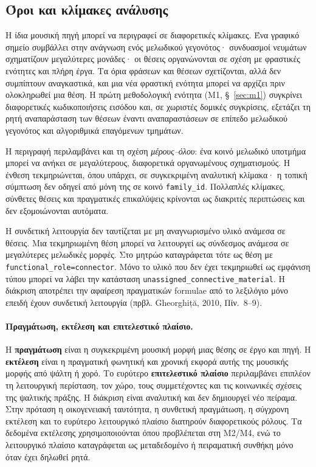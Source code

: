 \documentclass[11pt,a4paper]{article}
\begin{document}
\subsection{Όροι και κλίμακες ανάλυσης}

Η ίδια μουσική πηγή μπορεί να περιγραφεί σε διαφορετικές κλίμακες. Ένα γραφικό σημείο συμβάλλει στην ανάγνωση ενός μελωδικού γεγονότος· συνδυασμοί νευμάτων σχηματίζουν μεγαλύτερες μονάδες· οι θέσεις οργανώνονται σε σχέση με φραστικές ενότητες και πλήρη έργα. Τα όρια φράσεων και θέσεων σχετίζονται, αλλά δεν συμπίπτουν αναγκαστικά, και μια νέα φραστική ενότητα μπορεί να αρχίζει πριν ολοκληρωθεί μια θέση. Η πρώτη μεθοδολογική ενότητα (M1, §~\ref{sec:m1}) συγκρίνει διαφορετικές κωδικοποιήσεις εισόδου και, σε χωριστές δομικές συγκρίσεις, εξετάζει τη ρητή αναπαράσταση των θέσεων έναντι αναπαραστάσεων σε επίπεδο μελωδικού γεγονότος και αλγοριθμικά επαγόμενων τμημάτων.

Η περιγραφή περιλαμβάνει και τη σχέση \emph{μέρους--όλου}: ένα κοινό μελωδικό υποτμήμα μπορεί να ανήκει σε μεγαλύτερους, διαφορετικά οργανωμένους σχηματισμούς. Η ένθεση τεκμηριώνεται, όπου υπάρχει, σε συγκεκριμένη αναλυτική κλίμακα· η τοπική σύμπτωση δεν οδηγεί από μόνη της σε κοινό \texttt{family\_id}. Πολλαπλές κλίμακες, σύνθετες θέσεις και πραγματικές επικαλύψεις κρίνονται ως διακριτές περιπτώσεις και δεν εξομοιώνονται αυτόματα.

Η συνδετική λειτουργία δεν ταυτίζεται με μη αναγνωρισμένο υλικό ανάμεσα σε θέσεις. Μια τεκμηριωμένη θέση μπορεί να λειτουργεί ως σύνδεσμος ανάμεσα σε μεγαλύτερες μελωδικές μορφές. Στο μητρώο καταγράφεται τότε ως θέση με \texttt{functional\_role=connector}. Μόνο το υλικό που δεν έχει τεκμηριωθεί ως εμφάνιση τύπου μπορεί να λάβει την κατάσταση \texttt{unassigned\_connective\_material}. Η διάκριση αποτρέπει την αφαίρεση πραγματικών formulae από το λεξιλόγιο μόνο επειδή έχουν συνδετική λειτουργία (πρβλ. Gheorghiță, 2010, Πίν.~8--9).

\paragraph{Πραγμάτωση, εκτέλεση και επιτελεστικό πλαίσιο.}
Η \textbf{πραγμάτωση} είναι η συγκεκριμένη μουσική μορφή μιας θέσης σε έργο και πηγή. Η \textbf{εκτέλεση} είναι η πραγματική φωνητική και χρονική εκφορά αυτής της μουσικής μορφής από ψάλτη ή χορό. Το ευρύτερο \textbf{επιτελεστικό πλαίσιο} περιλαμβάνει επιπλέον τη λειτουργική περίσταση, τον χώρο, τους συμμετέχοντες και τις κοινωνικές σχέσεις της ψαλτικής πράξης. Η διάκριση είναι αναλυτική και δεν δημιουργεί νέο πείραμα. Στην πρόταση η οικογενειακή ταυτότητα, η συνθετική πραγμάτωση, η σύγχρονη εκτέλεση και το ευρύτερο λειτουργικό πλαίσιο διατηρούν διαφορετικούς ρόλους. Τα δεδομένα εκτέλεσης χρησιμοποιούνται όπου προβλέπεται στη M2/M4, ενώ το λειτουργικό πλαίσιο καταγράφεται ως μεταδεδομένο ή πειραματική συνθήκη μόνο όταν έχει δηλωθεί ρητά.
\end{document}
